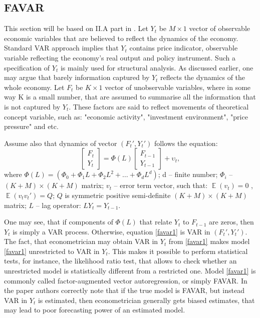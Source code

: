 \documentclass[a4paper, 14pt]{article}
\DeclareMathOperator*{\E}{\mathbb{E}}
\begin{document}
\subsection{FAVAR}
This section will be based on II.A part in \cite{bernanke2005measuring}. Let $Y_t$ be $M \times 1$ vector of observable economic variables that are believed to reflect the dynamics of the economy. Standard VAR approach implies that $Y_t$ contains price indicator, observable variable reflecting the economy's real output and policy instrument. Such a specification of $Y_t$ is mainly used for structural analysis. As discussed earlier, one may argue that barely information captured by $Y_t$ reflects the dynamics of the whole economy. Let $F_t$ be $K \times 1$ vector of unobservable variables, where in some way K is a small number, that are assumed to summarise all the information that is not captured by $Y_t$. These factors are said to reflect movements of theoretical concept variable, such as: "economic activity", "investment environment", "price pressure" and etc. 

Assume also that dynamics of vector $(F_t', Y_t')$ follows the equation:
\begin{equation}\label{favar1}
	\begin{bmatrix}
	F_t \\
	Y_t
	\end{bmatrix} = \Phi (L) 
	\begin{bmatrix}
	F_{t-1} \\
	Y_{t-1}
	\end{bmatrix} + \upsilon_t ,
\end{equation}
where $\Phi (L) = (\Phi_0 + \Phi_1 L + \Phi_2 L^2 + \dotso + \Phi_d L^d)$;  d -- finite number; $\Phi_i$ -- $(K+M) \times (K+M)$ matrix; $v_t$ -- error term vector, such that: $\E(v_t) = 0$ , $\E(v_t v_t') = Q$; $Q$ is symmetric positive semi-definite $(K+M) \times (K+M)$ matrix; $L$ -- lag operator: $L Y_t = Y_{t-1}$.

One may see, that if components of $\Phi(L)$ that relate $Y_t$ to $F_{t-1}$ are zeros, then $Y_t$ is simply a VAR process. Otherwise, equation \eqref{favar1} is VAR in $(F_t', Y_t')$. The fact, that econometrician may obtain VAR in $Y_t$ from \eqref{favar1} makes model \eqref{favar1} unrestricted to VAR in $Y_t$. This makes it possible to perform statistical tests, for instance, the likelihood ratio test, that allows to check whether an unrestricted model is statistically different from a restricted one. Model \eqref{favar1} is commonly called factor-augmented vector autoregression, or simply FAVAR. In the paper \cite{bernanke2005measuring} authors correctly note that if the true model is FAVAR, but instead VAR in $Y_t$ is estimated, then econometrician generally gets biased estimates, that may lead to poor forecasting power of an estimated model.
\end{document}
